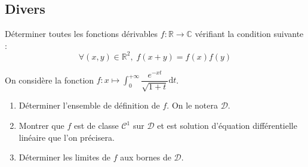 \documentclass[a4paper,twoside,french,11pt]{VcCours}
\newcommand{\dt}{\text{d}t}
\begin{document}
\subsection{Divers}









\begin{Exercice}{} Déterminer toutes les fonctions dérivables $f : \mathbb{R} \rightarrow \mathbb{C}$ vérifiant la condition suivante :
$$ \forall (x,y) \in \mathbb{R}^2, \; f(x+y)=f(x)f(y)$$
\end{Exercice}

%
%
%


\begin{Exercice}{} On considère la fonction $f : x \mapsto \int_0^{+ \infty} \dfrac{e^{-xt}}{\sqrt{1+t}} \dt$.
\begin{enumerate}
\item Déterminer l'ensemble de définition de $f$. On le notera $\mathcal{D}$.
\item Montrer que $f$ est de classe $\mathcal{C}^1$ sur $\mathcal{D}$ et est solution d'équation différentielle linéaire que l'on précisera.
\item Déterminer les limites de $f$ aux bornes de $\mathcal{D}$.
\end{enumerate}
\end{Exercice}
\end{document}
